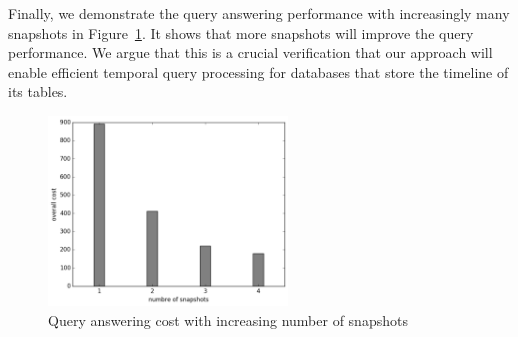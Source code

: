 Finally, we demonstrate the query answering performance with increasingly many
snapshots in Figure~\ref{fig:cost-multi}.  It shows that more snapshots will
improve the query performance.  We argue that this is a crucial verification
that our approach will enable efficient temporal query processing for databases
that store the timeline of its tables.

\begin{figure}[tb]
    \centering
    \includegraphics[width=2.5in]{figs/snap_cost.pdf}
    \caption{Query answering cost with increasing number of snapshots}
    \label{fig:cost-multi}
\end{figure}
